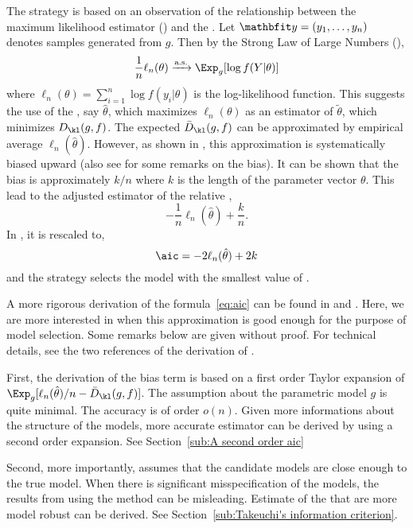 The \aic strategy is based on an observation of the relationship between the
maximum likelihood estimator (\mle) and the \kld. Let $\data =
(y_1,\dots,y_n)$ denotes \iid samples generated from $g$. Then by the Strong
Law of Large Numbers (\slln),
\begin{equation}
  \frac{1}{n}\ell_n(\theta) \xrightarrow{\text{a.s.}} \Exp_g[\log f(Y|\theta)]
  \label{eq:ml convergence}
\end{equation}
where $\ell_n(\theta) = \sum_{i=1}^n \log f(y_i|\theta)$ is the log-likelihood
function. This suggests the use of the \mle, say $\hat\theta$, which maximizes
$\ell_n(\theta)$ as an estimator of $\tilde\theta$, which minimizes
$D_{\kl}(g,f)$. The expected \kld $\bar{D}_{\kl}(g,f)$ can be approximated by
empirical average $\ell_n(\hat\theta)$. However, as shown in
\cite{Akaike:1973uc}, this approximation is systematically biased upward (also
see \cite[][sec.~2.3]{Claeskens:2008tq} for some remarks on the bias). It can
be shown that the bias is approximately $k/n$ where $k$ is the length of the
parameter vector $\theta$. This lead to the adjusted estimator of the relative
\kld,
\begin{equation}
  -\frac{1}{n}\ell_n(\hat\theta) + \frac{k}{n}.
\end{equation}
In \cite{Akaike:1973uc}, it is rescaled to,
\begin{equation}
  \aic = -2\ell_n(\hat\theta) + 2k
  \label{eq:aic}
\end{equation}
and the \aic strategy selects the model with the smallest value of \aic.

A more rigorous derivation of the formula~\eqref{eq:aic} can be found in
\cite[][sec.~2.3]{Claeskens:2008tq} and \cite[][sec.~6.2]{Burnham:2002wc}.
Here, we are more interested in when this approximation is good enough for the
purpose of model selection. Some remarks below are given without proof. For
technical details, see the two references of the derivation of \aic.

First, the derivation of the bias term is based on a first order Taylor
expansion of $\Exp_g[\ell_n(\hat\theta)/n - \bar{D}_{\kl}(g,f)]$. The
assumption about the parametric model $g$ is quite minimal. The accuracy is of
order $o(n)$. Given more informations about the structure of the models, more
accurate estimator can be derived by using a second order expansion. See
Section~\ref{sub:A second order aic}

Second, more importantly, \aic assumes that the candidate models are close
enough to the true model. When there is significant misspecification of the
models, the results from using the \aic method can be misleading. Estimate of
the \kld that are more model robust can be derived. See
Section~\ref{sub:Takeuchi's information criterion}.

